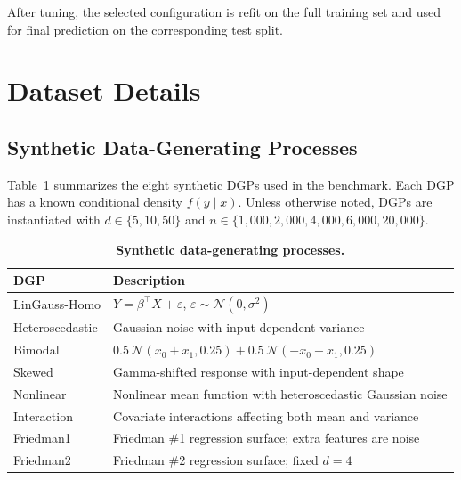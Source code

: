 \documentclass{article}
\begin{document}
After tuning, the selected configuration is refit on the full training set and
used for final prediction on the corresponding test split.


\section{Dataset Details}
\label{app:datasets}

\subsection{Synthetic Data-Generating Processes}
\label{app:synthetic_dgps}

Table~\ref{tab:synthetic_dgps} summarizes the eight synthetic DGPs used in the
benchmark. Each DGP has a known conditional density $f(y\mid x)$. Unless
otherwise noted, DGPs are instantiated with
$d\in\{5,10,50\}$ and
$n\in\{1{,}000,2{,}000,4{,}000,6{,}000,20{,}000\}$.

\begin{table}[t]
\centering
\caption{\textbf{Synthetic data-generating processes.}}
\label{tab:synthetic_dgps}
\small
\begin{tabular}{lp{9cm}}
\toprule
\textbf{DGP} & \textbf{Description} \\
\midrule
LinGauss-Homo    & $Y=\beta^\top X+\varepsilon$, $\varepsilon\sim\mathcal N(0,\sigma^2)$ \\
Heteroscedastic  & Gaussian noise with input-dependent variance \\
Bimodal          & $0.5\,\mathcal N(x_0+x_1,0.25)+0.5\,\mathcal N(-x_0+x_1,0.25)$ \\
Skewed           & Gamma-shifted response with input-dependent shape \\
Nonlinear        & Nonlinear mean function with heteroscedastic Gaussian noise \\
Interaction      & Covariate interactions affecting both mean and variance \\
Friedman1        & Friedman \#1 regression surface; extra features are noise \\
Friedman2        & Friedman \#2 regression surface; fixed $d=4$ \\
\bottomrule
\end{tabular}
\end{table}
\end{document}
